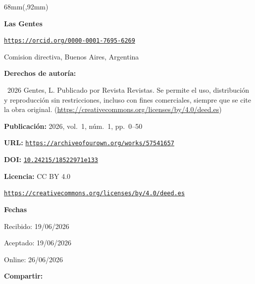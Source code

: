 \documentclass{article}
\newlength{\gbbloquex}
\begin{document}
\begin{textblock*}{68mm}(\gbbloquex,92mm)
{\setlength{\leftskip}{0pt}\setlength{\parindent}{0pt}%
\noindent\begin{minipage}[t]{68mm}
\sffamily\small\setlength{\parskip}{1pt}
{\bfseries\color{azulrevista}Las Gentes}\par
{\scriptsize\texttt{\href{https://orcid.org/0000-0001-7695-6269}{https://orcid.org/0000-0001-7695-6269}}}\par
Comision directiva, Buenos Aires, Argentina\par
\vspace{6pt}
{\bfseries\color{azulrevista!70}Derechos de autor\'ia:}\par
\textcopyright\ 2026 Gentes, L. Publicado por Revista Revistas. Se permite el uso, distribución y reproducción sin restricciones, incluso con fines comerciales, siempre que se cite la obra original. (\href{https://creativecommons.org/licenses/by/4.0/deed.es}{https://creativecommons.org/licenses/by/4.0/deed.es})\par\vspace{6pt}
{\bfseries\color{azulrevista!70}Publicación:} 2026, vol.~1, n\'um.~1, pp.~0--50\par\vspace{6pt}
{\bfseries\color{azulrevista!70}URL:} {\scriptsize\texttt{\href{https://archiveofourown.org/works/57541657}{https://archiveofourown.org/works/57541657}}}\par\vspace{6pt}
{\bfseries\color{azulrevista!70}DOI:} {\scriptsize\texttt{\href{https://doi.org/10.24215/18522971e133}{10.24215/18522971e133}}}\par\vspace{6pt}
{\bfseries\color{azulrevista!70}Licencia:} CC BY 4.0\par
{\scriptsize\texttt{\href{https://creativecommons.org/licenses/by/4.0/deed.es}{https://creativecommons.org/licenses/by/4.0/deed.es}}}\par
\vspace{6pt}
{\bfseries\color{azulrevista!70}Fechas}\par\vspace{2pt}
Recibido: 19/06/2026\par
Aceptado: 19/06/2026\par
Online: 26/06/2026\par
\vspace{6pt}
\vspace{6pt}
{\bfseries\color{azulrevista!70}Compartir:}\par\vspace{3pt}

\end{minipage}}
\end{textblock*}
\end{document}
